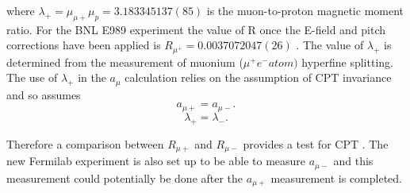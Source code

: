 where  $\lambda_{+} =  {\mu_{\mu+}}{\mu_{p}} = 3.183 345 137 (85)$ is the muon-to-proton magnetic moment ratio. For the BNL E989 experiment the value of R once the E-field and pitch corrections have been applied is $R_{\mu^{+}}= 0.003 707 204 7(26)$ \cite{Reference13}. The value of $\lambda_{+}$ is determined from the measurement of muonium ($\mu^{+}e^{-} atom)$ hyperfine splitting. The use of $\lambda_{+}$ in the $a_{\mu}$ calculation relies on the assumption of CPT invariance and so assumes 
\begin{equation}
a_{\mu+} = a_{\mu-}.
\end{equation}
\begin{equation}
{\lambda_{+}} = \lambda_{-}.
\end{equation}

Therefore a comparison between $R_{\mu+}$ and $R_{\mu-}$ provides a test for CPT \cite{Reference22}\cite{Reference29}. The new Fermilab experiment is also set up to be able to measure $a_{\mu-}$ and this measurement could potentially be done after the $a_{\mu+}$ measurement is completed.



